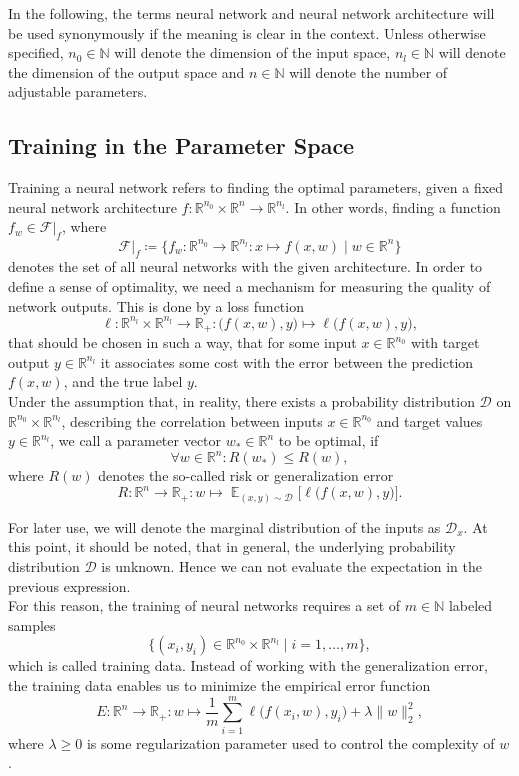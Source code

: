 \documentclass[11pt, a4paper]{article}
\newcommand{\N}{\mathbb{N}}
\newcommand{\R}{\mathbb{R}}
\newcommand{\D}{\mathcal{D}}
\newcommand{\F}{\mathcal{F}}
\DeclareMathOperator*{\E}{\mathbb{E}}
\begin{document}
In the following, the terms neural network and neural network architecture will be used synonymously if the meaning is clear in the context. Unless otherwise specified, $n_0 \in \N$ will denote the dimension of the input space, $n_l \in \N$ will denote the dimension of the output space and $n \in \N$ will denote the number of adjustable parameters.

\subsection{Training in the Parameter Space}\label{sec:Training}

Training a neural network refers to finding the optimal parameters, given a fixed neural network architecture $f : \R^{n_0} \times \R^n \to \R^{n_l}$. In other words, finding a function $f_w \in \F|_{f}$, where
\[ \F|_{f} \coloneq \Big \{ f_w : \R^{n_0} \to \R^{n_l} : x \mapsto f(x,w) \mid w \in \R^n \Big \} \]
denotes the set of all neural networks with the given architecture. In order to define a sense of optimality, we need a mechanism for measuring the quality of network outputs. This is done by a loss function
\[ \ell: \R^{n_l} \times \R^{n_l} \to \R_+ : \big ( f(x,w),y \big ) \mapsto \ell \big ( f(x,w),y \big ) ,\]
that should be chosen in such a way, that for some input $x \in \R^{n_0}$ with target output $y \in \R^{n_l}$ it associates some cost with the error between the prediction $f(x,w)$, and the true label $y$. \\

Under the assumption that, in reality, there exists a probability distribution $\D$ on $\R^{n_0} \times \R^{n_l}$, describing the correlation between inputs $x \in \R^{n_0}$ and target values $y \in \R^{n_l}$, we call a parameter vector $w_* \in \R^n$ to be optimal, if
\[ \forall w \in \R^n : R(w_*) \leq R(w), \]
where $R(w)$ denotes the so-called risk or generalization error 
\[ R : \R^n \to \R_+ : w \mapsto \E_{(x,y) \sim \D } \Big [ \ell \big (f(x,w),y \big ) \Big ]. \]

For later use, we will denote the marginal distribution of the inputs as $\D_x$. At this point, it should be noted, that in general, the underlying probability distribution $\D$ is unknown. Hence we can not evaluate the expectation in the previous expression. \\

For this reason, the training of neural networks requires a set of $m \in \N$ labeled samples
\[ \Big \{ (x_i,y_i) \in \R^{n_0} \times \R^{n_l} \mid i=1, \dots, m \Big \}, \]
which is called training data. Instead of working with the generalization error, the training data enables us to minimize the empirical error function
 \[ E : \R^n \to \R_+ : w \mapsto \frac{1}{m} \sum_{i=1}^{m} \ell \big ( f(x_i,w),y_i \big) + \lambda \big \| w \big \|_2^2, \]
where $\lambda \geq 0$ is some regularization parameter used to control the complexity of $w$. \\
 
\end{document}
